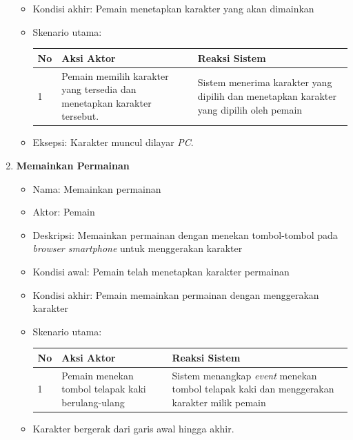 \begin{enumerate}
\begin{itemize}
		\item Kondisi akhir: Pemain menetapkan karakter yang akan dimainkan
		
		\item Skenario utama:
		
\begin{tabular}{ |p{1cm}|p{4cm}|p{4cm}|}
	\hline
	No & Aksi Aktor & Reaksi Sistem \\ \hline
	1 & Pemain memilih karakter yang tersedia dan menetapkan karakter tersebut. & Sistem menerima karakter yang dipilih dan menetapkan karakter yang dipilih oleh pemain \\ \hline
\end{tabular}

	\item Eksepsi: Karakter muncul dilayar \textit{PC}.
		
	\end{itemize}
	
	\item \textbf{Memainkan Permainan}
		
		\begin{itemize}
			\item Nama: Memainkan permainan
			
			\item Aktor: Pemain
			
			\item Deskripsi: Memainkan permainan dengan menekan tombol-tombol pada \textit{browser smartphone} untuk menggerakan karakter
			
			\item Kondisi awal: Pemain telah menetapkan karakter permainan
			
			\item Kondisi akhir: Pemain memainkan permainan dengan menggerakan karakter
			
			\item Skenario utama:

\begin{tabular}{ |p{1cm}|p{4cm}|p{4cm}|}
	\hline
	No & Aksi Aktor & Reaksi Sistem \\ \hline
	1 & Pemain menekan tombol telapak kaki berulang-ulang & Sistem menangkap \textit{event} menekan tombol telapak kaki dan menggerakan karakter milik pemain \\ \hline
\end{tabular}
			
			\item Karakter bergerak dari garis awal hingga akhir.	
			

\end{itemize}
\end{enumerate}

